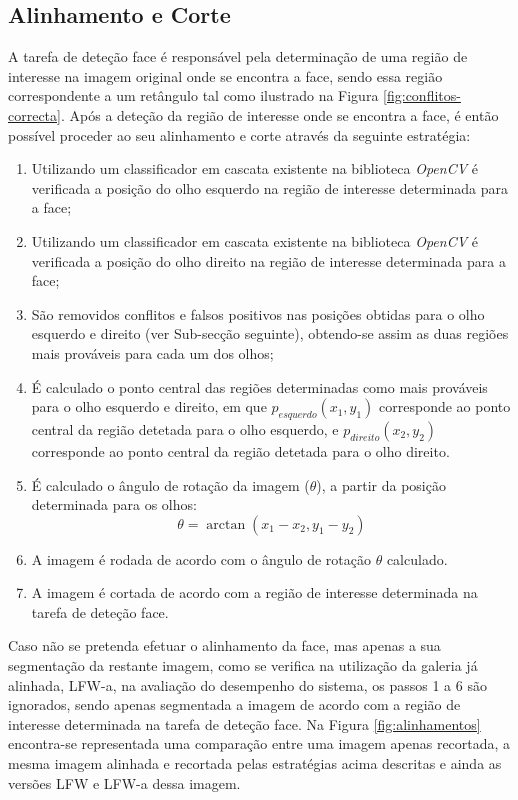 \subsection{Alinhamento e Corte} \label{sec:alinhamentoEcorte}
A tarefa de deteção face é responsável pela determinação de uma região de interesse na imagem original onde se encontra a face, sendo essa região correspondente a um retângulo tal como ilustrado na Figura \ref{fig:conflitos-correcta}. Após a deteção da região de interesse onde se encontra a face, é então possível proceder ao seu alinhamento e corte através da seguinte estratégia:

\begin{enumerate}
\item Utilizando um classificador em cascata existente na biblioteca \textit{OpenCV} é verificada a posição do olho esquerdo na região de interesse determinada para a face;
\item Utilizando um classificador em cascata existente na biblioteca \textit{OpenCV} é verificada a posição do olho direito na região de interesse determinada para a face;
\item São removidos conflitos e falsos positivos nas posições obtidas para o olho esquerdo e direito (ver Sub-secção seguinte), obtendo-se assim as duas regiões mais prováveis para cada um dos olhos;
\item É calculado o ponto central das regiões determinadas como mais prováveis para o olho esquerdo e direito, em que $p_{esquerdo}(x_1,y_1)$ corresponde ao ponto central da região detetada para o olho esquerdo, e  $p_{direito}(x_2,y_2)$ corresponde ao ponto central da região detetada para o olho direito.
\item É calculado o ângulo de rotação da imagem ($\theta$), a partir da posição determinada para os olhos:
\begin{equation}
\theta = \arctan(x_1 - x_2, y_1 - y_2)
\end{equation}
\item A imagem é rodada de acordo com o ângulo de rotação $\theta$ calculado.
\item A imagem é cortada de acordo com a região de interesse determinada na tarefa de deteção face.
\end{enumerate}

Caso não se pretenda efetuar o alinhamento da face, mas apenas a sua segmentação da restante imagem, como se verifica na utilização da galeria já alinhada, LFW-a, na avaliação do desempenho do sistema, os passos 1 a 6 são ignorados, sendo apenas segmentada a imagem de acordo com a região de interesse determinada na tarefa de deteção face. Na Figura \ref{fig:alinhamentos} encontra-se representada uma comparação entre uma imagem apenas recortada, a mesma imagem alinhada e recortada pelas estratégias acima descritas e ainda as versões LFW e LFW-a dessa imagem.

